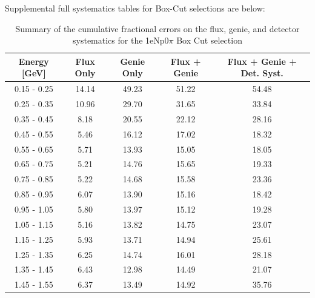 \documentclass[a4paper]{article}
\begin{document}
\par Supplemental full systematics tables for Box-Cut selections are below:

\begin{table}[H]
\centering
 \begin{tabular}{| c | c | c | c | c |} 
\hline
Energy [GeV] & Flux Only & Genie Only & Flux + Genie & Flux + Genie + Det. Syst. \\
\hline
0.15 - 0.25&14.14&49.23&51.22&54.48\\
0.25 - 0.35&10.96&29.70&31.65&33.84\\
0.35 - 0.45&8.18&20.55&22.12&28.16\\
0.45 - 0.55&5.46&16.12&17.02&18.32\\
0.55 - 0.65&5.71&13.93&15.05&18.05\\
0.65 - 0.75&5.21&14.76&15.65&19.33\\
0.75 - 0.85&5.22&14.68&15.58&23.36\\
0.85 - 0.95&6.07&13.90&15.16&18.42\\
0.95 - 1.05&5.80&13.97&15.12&19.28\\
1.05 - 1.15&5.16&13.82&14.75&23.07\\
1.15 - 1.25&5.93&13.71&14.94&25.61\\
1.25 - 1.35&6.25&14.74&16.01&28.18\\
1.35 - 1.45&6.43&12.98&14.49&21.07\\
1.45 - 1.55&6.37&13.49&14.92&35.76\\
\hline
\end{tabular}
\caption{Summary of the cumulative fractional errors on the flux, genie, and detector systematics for the 1eNp0$\pi$ Box Cut selection}
\label{tab:1eNp0pi_boxcut_errors}
\end{table}
\end{document}

